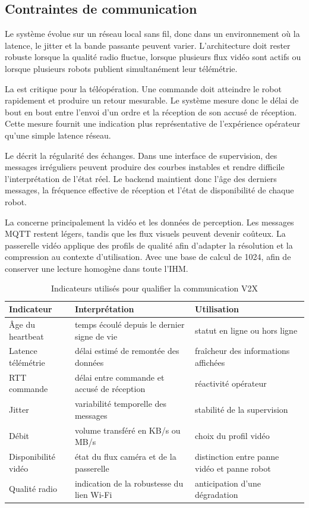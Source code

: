 \subsection{Contraintes de communication}

Le système évolue sur un réseau local sans fil, donc dans un environnement où la latence, le jitter et la bande passante peuvent varier. L'architecture doit rester robuste lorsque la qualité radio fluctue, lorsque plusieurs flux vidéo sont actifs ou lorsque plusieurs robots publient simultanément leur télémétrie.

La  est critique pour la téléopération. Une commande doit atteindre le robot rapidement et produire un retour mesurable. Le système mesure donc le délai de bout en bout entre l'envoi d'un ordre et la réception de son accusé de réception. Cette mesure fournit une indication plus représentative de l'expérience opérateur qu'une simple latence réseau.

Le  décrit la régularité des échanges. Dans une interface de supervision, des messages irréguliers peuvent produire des courbes instables et rendre difficile l'interprétation de l'état réel. Le backend maintient donc l'âge des derniers messages, la fréquence effective de réception et l'état de disponibilité de chaque robot.

La  concerne principalement la vidéo et les données de perception. Les messages MQTT restent légers, tandis que les flux visuels peuvent devenir coûteux. La passerelle vidéo applique des profils de qualité afin d'adapter la résolution et la compression au contexte d'utilisation.  Avec une base de calcul de 1024, afin de conserver une lecture homogène dans toute l'IHM.

\begin{table}[H]
\centering
\small
\renewcommand{\arraystretch}{1.18}
\begin{tabular}{|p{3.5cm}|p{5.6cm}|p{4.5cm}|}
\hline
\textbf{Indicateur} & \textbf{Interprétation} & \textbf{Utilisation} \\
\hline
Âge du heartbeat & temps écoulé depuis le dernier signe de vie & statut en ligne ou hors ligne \\
\hline
Latence télémétrie & délai estimé de remontée des données & fraîcheur des informations affichées \\
\hline
RTT commande & délai entre commande et accusé de réception & réactivité opérateur \\
\hline
Jitter & variabilité temporelle des messages & stabilité de la supervision \\
\hline
Débit & volume transféré en KB/s ou MB/s & choix du profil vidéo \\
\hline
Disponibilité vidéo & état du flux caméra et de la passerelle & distinction entre panne vidéo et panne robot \\
\hline
Qualité radio & indication de la robustesse du lien Wi-Fi & anticipation d'une dégradation \\
\hline
\end{tabular}
\caption{Indicateurs utilisés pour qualifier la communication V2X}
\label{tab:v2x_qos_v2}
\end{table}

